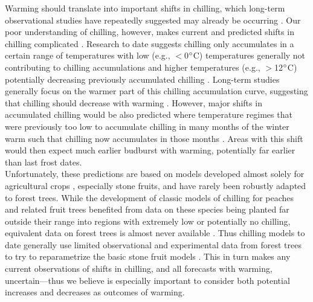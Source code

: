 \documentclass[11pt,letter]{article}
\begin{document}
Warming should translate into important shifts in chilling, which long-term observational studies have repeatedly suggested may already be occurring \citep{fu2015,piao2017}.  Our poor understanding of chilling, however, makes current and predicted shifts in chilling complicated \citep{chuine2016}. Research to date suggests chilling only accumulates in a certain range of temperatures with low (e.g., $<$0$\degree$C) temperatures generally not contributing to chilling accumulations and higher temperatures (e.g., $>$12$\degree$C) potentially decreasing previously accumulated chilling \citep{richardson1974,fishman1987}. Long-term studies generally focus on the warmer part of this chilling accumulation curve, suggesting that chilling should decrease with warming \citep{fu2015,piao2017,gauzere2019}.  However, major shifts in accumulated chilling would be also predicted where temperature regimes that were previously too low to accumulate chilling in many months of the winter warm such that chilling now accumulates in those months \citep{guy2014}. Areas with this shift would then expect much earlier budburst with warming, potentially far earlier than last frost dates. \\ %

Unfortunately, these predictions are based on models developed almost solely for agricultural crops \citep[but see][]{harrington2015}, especially stone fruits, and have rarely been robustly adapted to forest trees. While the development of classic models of chilling for peaches and related fruit trees benefited from data on these species being planted far outside their range into regions with extremely low or potentially no chilling, equivalent data on forest trees is almost never available \citep{dennis2003}. Thus chilling models to date generally use limited observational and experimental data from forest trees to try to reparametrize the basic stone fruit models \citep{Chuine2000}. This in turn makes any current observations of shifts in chilling, and all forecasts with warming, uncertain---thus we believe is especially important to consider both potential increases and decreases as outcomes of warming. \\
\end{document}
